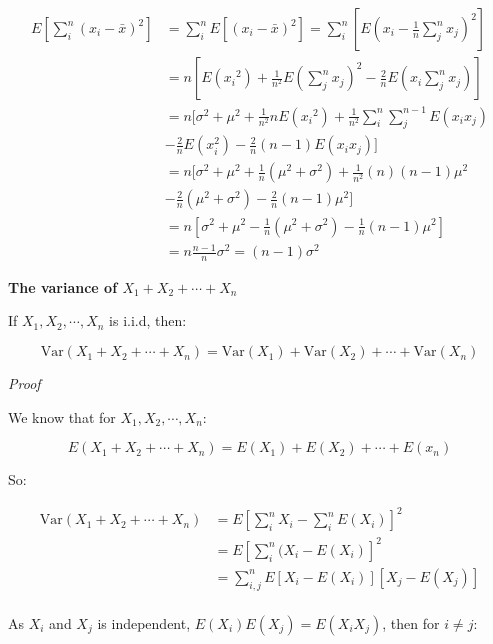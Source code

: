 \documentclass{article}
\newcommand{\Var}{\mathrm{Var}}
\begin{document}
\begin{equation*}
\begin{split}
    E[\sum_{i}^n(x_i-\bar{x})^2]&=\sum_i^nE[(x_i-\bar{x})^2]=\sum_i^n[E(x_i-\frac{1}{n}\sum_{j}^nx_j)^2]\\
    &=n[E({x_i}^2)+\frac{1}{n^2}E(\sum_{j}^nx_j)^2-\frac{2}{n}E(x_i\sum_{j}^nx_j)]\\
    &=n[\sigma^2+\mu^2+\frac{1}{n^2}nE({x_i}^2)+\frac{1}{n^2}\sum_{i}^{n}\sum_{j}^{n-1}E(x_ix_j)\\
    &-\frac{2}{n}E(x_i^2)-\frac{2}{n}(n-1)E(x_ix_j)]\\
    &=n[\sigma^2+\mu^2+\frac{1}{n}(\mu^2+\sigma^2)+\frac{1}{n^2}(n)(n-1)\mu^2\\
    &-\frac{2}{n}(\mu^2+\sigma^2)-\frac{2}{n}(n-1)\mu^2]\\
    &=n[\sigma^2+\mu^2-\frac{1}{n}(\mu^2+\sigma^2)-\frac{1}{n}(n-1)\mu^2]\\
    &=n\frac{n-1}{n}\sigma^2=(n-1)\sigma^2
\end{split}
\end{equation*}

\vspace{3mm}

\textbf{The variance of \(X_1+X_2+\cdots+X_n\)}

If $X_1, X_2, \cdots, X_n$ is i.i.d, then:

\begin{equation}
\Var(X_1+X_2+\cdots+X_n)=\Var(X_1)+\Var(X_2)+\cdots+\Var(X_n)
\end{equation}

\textit{Proof}

We know that for $X_1, X_2, \cdots, X_n$:

\begin{equation}
E(X_1+X_2+\cdots+X_n)=E(X_1)+E(X_2)+\cdots+E(x_n)
\end{equation}

So:

\begin{equation*}
\begin{split}
  \Var(X_1+X_2+\cdots+X_n)&=E{[\sum_i^nX_i-\sum_i^nE(X_i)]^2}\\
  &=E{[\sum_i^n(X_i-E(X_i)]^2}\\
  &=\sum_{i,j}^nE{[X_i-E(X_i)][X_j-E(X_j)]}\\
\end{split}
\end{equation*}

As \(X_i\) and \(X_j\) is independent, \(E(X_i)E(X_j)=E(X_iX_j)\), then for \(i \neq j\):
\end{document}
